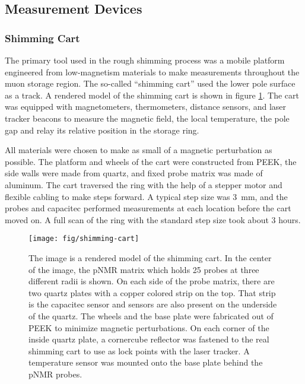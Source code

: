 \subsection{Measurement Devices}

\subsubsection{Shimming Cart}
The primary tool used in the rough shimming process was a mobile platform engineered from low-magnetism materials to make measurements throughout the muon storage region.  The so-called ``shimming cart'' used the lower pole surface as a track.  A rendered model of the shimming cart is shown in figure \ref{fig:shimming-cart}.  The cart was equipped with magnetometers, thermometers, distance sensors, and laser tracker beacons to measure the magnetic field, the local temperature, the pole gap and relay its relative position in the storage ring.

All materials were chosen to make as small of a magnetic perturbation as possible.  The platform and wheels of the cart were constructed from PEEK, the side walls were made from quartz, and fixed probe matrix was made of aluminum.  The cart traversed the ring with the help of a stepper motor and flexible cabling to make steps forward.  A typical step size was \SI{3}{\mm}, and the probes and capacitec performed measurements at each location before the cart moved on.  A full scan of the ring with the standard step size took about 3 hours.

\begin{figure}
\centering
\texttt{[image: fig/shimming-cart]}
\caption{
    The image is a rendered model of the shimming cart. In the center of the image, the pNMR matrix which holds 25 probes at three different radii is shown.  On each side of the probe matrix, there are two quartz plates with a copper colored strip on the top.  That strip is the capacitec sensor and sensors are also present on the underside of the quartz.  The wheels and the base plate were fabricated out of PEEK to minimize magnetic perturbations. On each corner of the inside quartz plate, a cornercube reflector was fastened to the real shimming cart to use as lock points with the laser tracker. A temperature sensor was mounted onto the base plate behind the pNMR probes. 
    \label{fig:shimming-cart}
}
\end{figure}

